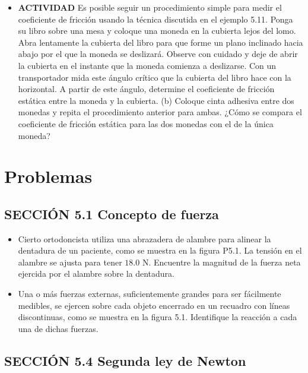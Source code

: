 \documentclass[11pt,a4paper]{article}
\begin{document}
\begin{itemize}
    \item[\textbf{3.}] \textbf{ACTIVIDAD} Es posible seguir un procedimiento simple para medir el coeficiente de fricción usando la técnica discutida en el ejemplo 5.11. Ponga su libro sobre una mesa y coloque una moneda en la cubierta lejos del lomo. Abra lentamente la cubierta del libro para que forme un plano inclinado hacia abajo por el que la moneda se deslizará. Observe con cuidado y deje de abrir la cubierta en el instante que la moneda comienza a deslizarse. Con un transportador mida este ángulo crítico que la cubierta del libro hace con la horizontal. A partir de este ángulo, determine el coeficiente de fricción estática entre la moneda y la cubierta. (b) Coloque cinta adhesiva entre dos monedas y repita el procedimiento anterior para ambas. ¿Cómo se compara el coeficiente de fricción estática para las dos monedas con el de la única moneda?
    \vspace*{8cm}
\end{itemize}

\newpage

\section*{Problemas}

\subsection*{SECCIÓN 5.1 Concepto de fuerza}

\begin{itemize}
    \item[\textbf{1.}] Cierto ortodoncista utiliza una abrazadera de alambre para alinear la dentadura de un paciente, como se muestra en la figura P5.1. La tensión en el alambre se ajusta para tener $18.0 \text{ N}$. Encuentre la magnitud de la fuerza neta ejercida por el alambre sobre la dentadura.
    \vspace*{6cm}

    \item[\textbf{2.}] Una o más fuerzas externas, suficientemente grandes para ser fácilmente medibles, se ejercen sobre cada objeto encerrado en un recuadro con líneas discontinuas, como se muestra en la figura 5.1. Identifique la reacción a cada una de dichas fuerzas.
    \vspace*{6cm}
\end{itemize}

\subsection*{SECCIÓN 5.4 Segunda ley de Newton}
\end{document}
